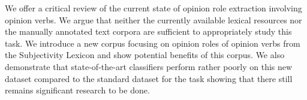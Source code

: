 We offer a critical review of the current state of opinion role extraction involving opinion verbs. We argue that neither the currently available lexical resources nor the manually annotated text corpora are sufficient to appropriately study this task. We introduce a new corpus focusing on opinion roles of opinion verbs from the Subjectivity Lexicon and show potential benefits of this corpus. We also demonstrate that state-of-the-art classifiers perform rather poorly on this new dataset compared to the standard dataset for the task showing that there still remains significant research to be done.

